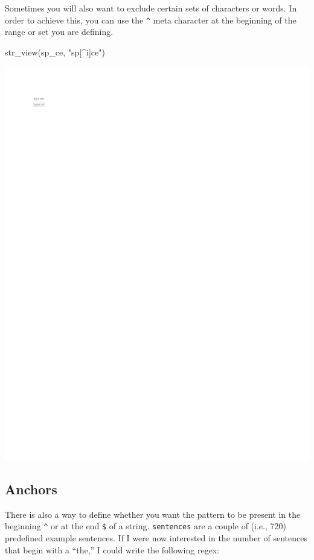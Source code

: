 \documentclass[
]{book}
\newenvironment{Shaded}{\begin{snugshade}}{\end{snugshade}}
\newcommand{\FunctionTok}[1]{\textcolor[rgb]{0.00,0.00,0.00}{#1}}
\newcommand{\NormalTok}[1]{#1}
\newcommand{\StringTok}[1]{\textcolor[rgb]{0.31,0.60,0.02}{#1}}
\begin{document}
Sometimes you will also want to exclude certain sets of characters or words. In order to achieve this, you can use the \texttt{\^{}} meta character at the beginning of the range or set you are defining.

\begin{Shaded}
\begin{Highlighting}[]
\FunctionTok{str\_view}\NormalTok{(sp\_ce, }\StringTok{"sp[\^{}i]ce"}\NormalTok{)}
\end{Highlighting}
\end{Shaded}

\includegraphics{_main_files/figure-latex/unnamed-chunk-33-1.pdf}

\hypertarget{anchors}{%
\subsection{Anchors}\label{anchors}}

There is also a way to define whether you want the pattern to be present in the beginning \texttt{\^{}} or at the end \texttt{\$} of a string. \texttt{sentences} are a couple of (i.e., 720) predefined example sentences. If I were now interested in the number of sentences that begin with a ``the,'' I could write the following regex:
\end{document}
